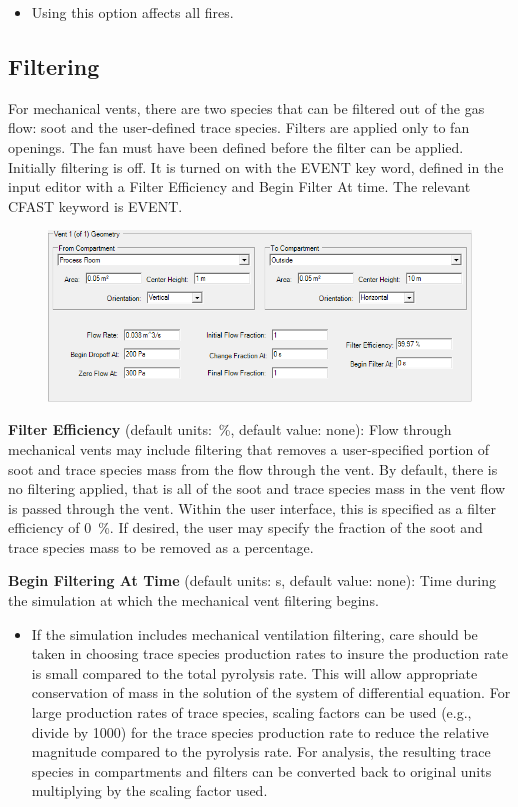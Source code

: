 \begin{itemize}
\item Using this option affects all fires.
\end{itemize}

\subsection{Filtering}

For mechanical vents, there are two species that can be filtered out of the gas flow: soot and the user-defined trace species. Filters are applied only to fan openings. The fan must have been defined before the filter can be applied. Initially filtering is off. It is turned on with the EVENT key word, defined in the input editor with a Filter Efficiency and Begin Filter At time. The relevant CFAST keyword is EVENT.

\begin{figure}[h!]
\begin{center}
\includegraphics[width=6.5in]{FIGURES/Input_File/Filtering}
\end{center}
\end{figure}

\textbf{Filter Efficiency} (default units:~\%, default value: none): Flow through mechanical vents may include filtering that removes a user-specified portion of soot and trace species mass from the flow through the vent.  By default, there is no filtering applied, that is all of the soot and trace species mass in the vent flow is passed through the vent. Within the user interface, this is specified as a filter efficiency of 0~\%.  If desired, the user may specify the fraction of the soot and trace species mass to be removed as a percentage.

\textbf{Begin Filtering At Time} (default units: s, default value: none): Time during the simulation at which the mechanical vent filtering begins.

\begin{itemize}
\item If the simulation includes mechanical ventilation filtering, care should be taken in choosing trace species production rates to insure the production rate is small compared to the total pyrolysis rate.  This will allow appropriate conservation of mass in the solution of the system of differential equation.  For large production rates of trace species, scaling factors can be used (e.g., divide by 1000) for the trace species production rate to reduce the relative magnitude compared to the pyrolysis rate.  For analysis, the resulting trace species in compartments and filters can be converted back to original units multiplying by the scaling factor used.
\end{itemize} 